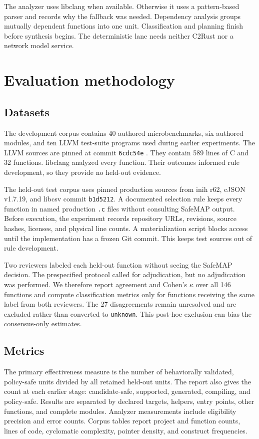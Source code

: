 \documentclass[conference]{IEEEtran}
\newcommand{\tool}{SafeMAP\xspace}
\begin{document}
The analyzer uses libclang when available. Otherwise it uses a pattern-based
parser and records why the fallback was needed. Dependency analysis groups
mutually dependent functions into one unit. Classification and planning finish
before synthesis begins. The deterministic lane needs neither C2Rust nor a
network model service.

\section{Evaluation methodology}

\subsection{Datasets}

The development corpus contains 40 authored microbenchmarks, six authored
modules, and ten LLVM test-suite programs used during earlier experiments. The
LLVM sources are pinned at commit \texttt{6cdc54e} \cite{llvmtestsuite}. They
contain 589 lines of C and 32 functions. libclang analyzed every function.
Their outcomes informed rule development, so they provide no held-out evidence.

The held-out test corpus uses pinned production sources from inih r62, cJSON
v1.7.19, and libcsv commit \texttt{b1d5212}. A documented selection rule keeps
every function in named production \texttt{.c} files without consulting \tool
output. Before execution, the experiment records repository URLs, revisions,
source hashes, licenses, and physical line counts. A materialization script
blocks access until the implementation has a frozen Git commit. This keeps test
sources out of rule development.

Two reviewers labeled each held-out function without seeing the \tool decision.
The prespecified protocol called for adjudication, but no adjudication was
performed. We therefore report agreement and Cohen's $\kappa$ over all 146
functions and compute classification metrics only for functions receiving the
same label from both reviewers. The 27 disagreements remain unresolved and are
excluded rather than converted to \texttt{unknown}. This post-hoc exclusion can
bias the consensus-only estimates.

\subsection{Metrics}

The primary effectiveness measure is the number of behaviorally validated,
policy-safe units divided by all retained held-out units. The report also gives
the count at each earlier stage: candidate-safe, supported, generated,
compiling, and policy-safe. Results are separated by declared targets, helpers,
entry points, other functions, and complete modules. Analyzer measurements
include eligibility precision and error counts. Corpus tables report project
and function counts, lines of code, cyclomatic complexity, pointer density, and
construct frequencies.
\end{document}
